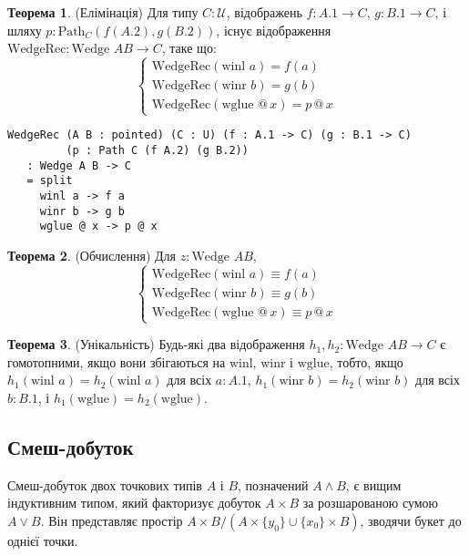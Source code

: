 \documentclass{article}
\theoremstyle{definition}
\newtheorem{theorem}{Теорема}
\begin{document}
\begin{theorem} (Елімінація)
Для типу \( C : \mathcal{U} \), відображень \( f : A.1 \to C \), \( g : B.1 \to C \), і шляху \( p : \text{Path}_C (f (A.2), g (B.2)) \), існує відображення \( \text{WedgeRec} : \text{Wedge } A B \to C \), таке що:
\[
\begin{cases}
\text{WedgeRec}(\text{winl } a) = f(a) \\
\text{WedgeRec}(\text{winr } b) = g(b) \\
\text{WedgeRec}(\text{wglue } @ \, x) = p \, @ \, x
\end{cases}
\]
\begin{lstlisting}
WedgeRec (A B : pointed) (C : U) (f : A.1 -> C) (g : B.1 -> C)
         (p : Path C (f A.2) (g B.2))
   : Wedge A B -> C
   = split
     winl a -> f a
     winr b -> g b
     wglue @ x -> p @ x
\end{lstlisting}
\end{theorem}

\begin{theorem} (Обчислення)
Для \( z : \text{Wedge } A B \),
\[
\begin{cases}
\text{WedgeRec}(\text{winl } a) \equiv f(a) \\
\text{WedgeRec}(\text{winr } b) \equiv g(b) \\
\text{WedgeRec}(\text{wglue } @ \, x) \equiv p \, @ \, x
\end{cases}
\]
\end{theorem}

\begin{theorem} (Унікальність)
Будь-які два відображення \( h_1, h_2 : \text{Wedge } A B \to C \) є гомотопними, якщо
вони збігаються на \( \text{winl} \), \( \text{winr} \) і \( \text{wglue} \),
тобто, якщо \( h_1(\text{winl } a) = h_2(\text{winl } a) \) для
всіх \( a : A.1 \), \( h_1(\text{winr } b) = h_2(\text{winr } b) \) для
всіх \( b : B.1 \), і \( h_1(\text{wglue}) = h_2(\text{wglue}) \).
\end{theorem}

\subsection{Смеш-добуток}
Смеш-добуток двох точкових типів \( A \) і \( B \), позначений \( A \wedge B \),
є вищим індуктивним типом, який факторизує добуток \( A \times B \) за
розшарованою сумою \( A \vee B \). Він представляє простір \( A \times B / (A \times \{ y_0 \} \cup \{ x_0 \} \times B) \),
зводячи букет до однієї точки.
\end{document}
